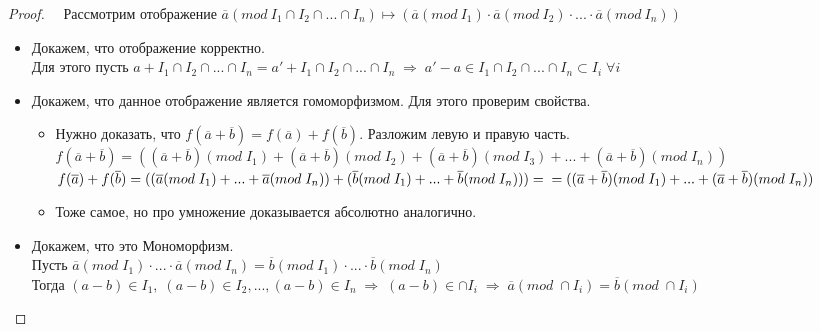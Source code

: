 \documentclass[12pt, a4paper]{article}
\newcommand{\ra}{\;\Rightarrow\;}
\theoremstyle{plain}
\theoremstyle{definition}
\begin{document}
\begin{proof} ~\
    Рассмотрим отображение $\overline{a}(mod \ I_1\cap I_2 \cap ... \cap I_n) \longmapsto (\overline{a}(mod \ I_1)\cdot \overline{a}(mod \ I_2)\cdot...\cdot \overline{a}(mod \ I_n))$
    \begin{itemize}
        \item Докажем, что отображение корректно. \\
        Для этого пусть $a+I_1\cap I_2 \cap ... \cap I_n = a'+I_1\cap I_2 \cap ... \cap I_n\ra a'-a \in I_1\cap I_2 \cap ... \cap I_n\subset I_i\; \forall i$
        \item Докажем, что данное отображение является гомоморфизмом. Для этого проверим свойства.
        \begin{itemize}
            \item Нужно доказать, что $f(\overline{a}+\overline{b})=f(\overline{a})+f(\overline{b})$. Разложим левую и правую часть.\\
                $f(\overline{a}+\overline{b}) = ((\overline{a}+\overline{b})(mod \; I_1)+(\overline{a}+\overline{b})(mod \; I_2)+(\overline{a}+\overline{b})(mod \; I_3)+...+(\overline{a}+\overline{b})(mod \; I_n
                ))$\\
                $f(\overline{a})+f(\overline{b}) = ((\overline{a}(mod\;I_1)+...+\overline{a}(mod\;I_n))+(\overline{b}(mod\;I_1)+...+\overline{b}(mod\;I_n))) = \\ = 
                ((\overline{a}+\overline{b})(mod \; I_1)+...+(\overline{a}+\overline{b})(mod \; I_n
                ))$
            \item Тоже самое, но про умножение доказывается абсолютно аналогично.
            
        \end{itemize}
        \item Докажем, что это Мономорфизм. \\ Пусть $\overline{a}(mod \; I_1)\cdot...\cdot \overline{a}(mod \; I_n) = \overline{b}(mod \; I_1)\cdot...\cdot \overline{b}(mod \; I_n)$\\
            Тогда \((a-b)\in I_1,\; (a-b)\in I_2,...,(a-b)\in I_n\ra (a-b)\in\cap I_i\ra \overline{a}(mod \; \cap I_i) = \overline{b}(mod \; \cap I_i)\)


\end{itemize}
\end{proof}
\end{document}
